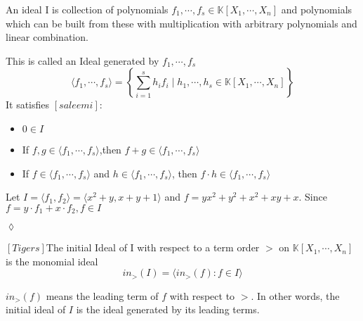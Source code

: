 \begin{env_definition}[Ideal]
\cite{KHZ}
An ideal I is collection of polynomials $f_{1}, \cdots , f_{s} \in \mathbb{K}\left[X_{1}, \cdots, X_{n}\right] $ and polynomials which can be built from these with multiplication with arbitrary polynomials and linear combination.

\end{env_definition}
This is called an Ideal generated by $f_{1}, \cdots , f_{s}$ \\
\[ \langle f_{1}, \cdots , f_{s} \rangle = \left\lbrace  \sum_{i=1}^s h_{i}f_{i} \mid h_{1}, \cdots , h_{s} \in \mathbb{K}\left[X_{1}, \cdots, X_{n}\right] \right\rbrace \]
It satisfies $[saleemi] $:
\begin{center}

\begin{itemize}
\item
$0 \in I$ 
\item
If $f,g \in \langle f_{1}, \cdots , f_{s} \rangle$,then  $f+g \in \langle f_{1}, \cdots , f_{s} \rangle$ 
\item
If $f \in \langle f_{1}, \cdots , f_{s} \rangle$ and $h \in  \langle f_{1}, \cdots , f_{s} \rangle$, then $f \cdot h \in \langle f_{1}, \cdots , f_{s} \rangle$
\end{itemize}

\end{center}

\newpage

\begin{env_example}\normalfont
Let $ I= \langle f_{1},f_{2} \rangle = \langle x^{2}+y, x+y+1 \rangle $ and $f=yx^{2}+y^{2}+x^{2}+xy+x$. Since $f= y \cdot f_{1} + x \cdot f_{2}, f\in I$
\begin{flushright}
$\lozenge$
\end{flushright} 
\end{env_example}


\begin{env_definition}
$[Tigers]$The initial Ideal of I with respect to a term order $>$ on $\mathbb{K}\left[X_{1}, \cdots, X_{n}\right]$ is the monomial ideal \\
\[in_{>}(I) = \langle in_{>}(f) : f \in I  \rangle \] 

\end{env_definition}
$in_{>}(f)$ means the leading term of $f$ with respect to $>$. In other words, the initial ideal of $I$ is the ideal generated by its leading terms.



